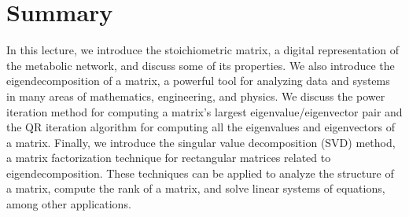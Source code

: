 \documentclass{article}[11pt]
\begin{document}
\section{Summary}
In this lecture, we introduce the stoichiometric matrix, a digital representation of the metabolic network, and discuss some of its properties.
We also introduce the eigendecomposition of a matrix, a powerful tool for analyzing data and systems in many areas of mathematics, engineering, and physics.
We discuss the power iteration method for computing a matrix's largest eigenvalue/eigenvector pair and the QR iteration algorithm for computing all the eigenvalues and eigenvectors of a matrix.
Finally, we introduce the singular value decomposition (SVD) method, a matrix factorization technique for rectangular matrices related to eigendecomposition. These techniques can be applied to analyze the structure of a matrix, compute the rank of a matrix, and solve linear systems of equations, among other applications.


\end{document}
